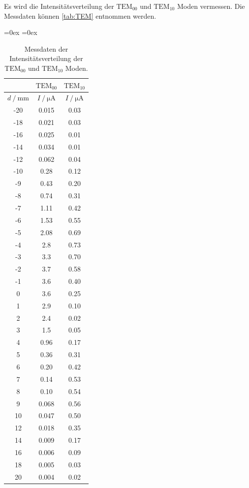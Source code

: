 Es wird die Intensitätsverteilung der $\text{TEM}_{00}$ und $\text{TEM}_{10}$ Moden vermessen. Die Messdaten können \autoref{tab:TEM} entnommen werden.
\begin{table}[H]
  \centering
  \aboverulesep=0ex %
  \belowrulesep=0ex %
  \caption{Messdaten der Intensitätsverteilung der $\text{TEM}_{00}$ und $\text{TEM}_{10}$ Moden.}
  \label{tab:TEM}
  \begin{tabular}{S[table-format = 2.0] | S[table-format = 1.3]  S[table-format = 1.2]}
    {} & {$\text{TEM}_{00}$} & {$\text{TEM}_{10}$} \\
    \midrule
    \rule{0pt}{1.1EM}
    {$d \mathbin{/} \unit{\milli\metre}$} & {$I \mathbin{/} \unit{\micro\ampere}$} & {$I \mathbin{/} \unit{\micro\ampere}$} \\
    \midrule
    \rule{0pt}{1.1EM}
    -20 & 0.015 & 0.03 \\
    -18 & 0.021 & 0.03 \\
    -16 & 0.025 & 0.01 \\
    -14 & 0.034 & 0.01 \\
    -12 & 0.062 & 0.04 \\
    -10 & 0.28  & 0.12 \\
     -9 & 0.43  & 0.20 \\
     -8 & 0.74  & 0.31 \\
     -7 & 1.11  & 0.42 \\
     -6 & 1.53  & 0.55 \\
     -5 & 2.08  & 0.69 \\
     -4 & 2.8   & 0.73 \\
     -3 & 3.3   & 0.70 \\
     -2 & 3.7   & 0.58 \\
     -1 & 3.6   & 0.40 \\
      0 & 3.6   & 0.25 \\
      1 & 2.9   & 0.10 \\
      2 & 2.4   & 0.02 \\
      3 & 1.5   & 0.05 \\
      4 & 0.96  & 0.17 \\
      5 & 0.36  & 0.31 \\
      6 & 0.20  & 0.42 \\
      7 & 0.14  & 0.53 \\
      8 & 0.10  & 0.54 \\
      9 & 0.068 & 0.56 \\
     10 & 0.047 & 0.50 \\
     12 & 0.018 & 0.35 \\
     14 & 0.009 & 0.17 \\
     16 & 0.006 & 0.09 \\
     18 & 0.005 & 0.03 \\
     20 & 0.004 & 0.02 \\
  \end{tabular}
\end{table}

